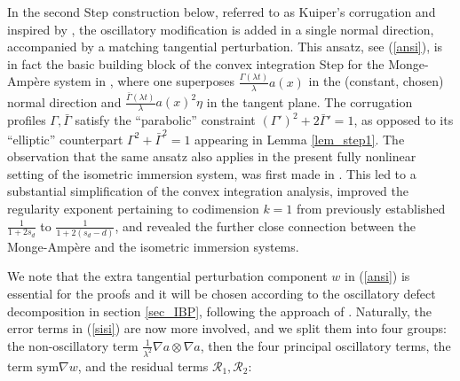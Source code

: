 \documentclass[reqno,twoside,11pt]{amsart}
\newcommand{\sym}{\mathrm{sym}}
\numberwithin{equation}{section}
\theoremstyle{plain}
\theoremstyle{definition}
\begin{document}
\medskip

\noindent In the second Step construction below, referred to as Kuiper's
corrugation and inspired by \cite{Kuiper}, the oscillatory modification is
added in a single normal direction, accompanied by a
matching tangential perturbation. This ansatz, see (\ref{ansi}), is in fact the
basic building block of the convex integration Step for the Monge-Amp\`ere system
in \cite{lew_conv, lewpak_MA}, where one superposes $\frac{\Gamma(\lambda t
  )}{\lambda} a(x)$ in the (constant, chosen) normal direction and
$\frac{\bar\Gamma(\lambda t )}{\lambda}a(x)^2\eta$ in the tangent
plane. The corrugation profiles $\Gamma, \bar\Gamma$ satisfy
the ``parabolic'' constraint $(\Gamma')^2+2\bar\Gamma'=1$, as opposed
to its ``elliptic'' counterpart $\Gamma^2+ \bar\Gamma^2=1$ appearing in Lemma \ref{lem_step1}.
The observation that the same ansatz also applies in the present fully
nonlinear setting of the isometric immersion system, was first made
in \cite[Lemma 3.1]{CHI2}. This led to a substantial simplification of the convex
integration analysis, improved the regularity
exponent pertaining to codimension $k=1$ from previously established
$\frac{1}{1+2s_d}$ to $\frac{1}{1+2(s_d-d)}$, and 
revealed the further close connection between the Monge-Amp\`ere
and the isometric immersion systems.

\medskip

\noindent We note that the extra tangential 
perturbation component $w$ in (\ref{ansi}) is essential for the
proofs  and it will be chosen according to the
oscillatory defect decomposition in section \ref{sec_IBP}, following
the approach of \cite{CHI2, in_lew2}. Naturally, the error terms in
(\ref{sisi}) are now more involved, and we 
split them into four groups: the non-oscillatory term
$\frac{1}{\lambda^2}\nabla a\otimes\nabla a$, then
the four principal oscillatory terms,
the term $\sym\nabla w$, and the residual terms $\mathcal{R}_1, \mathcal{R}_2$:
\end{document}
